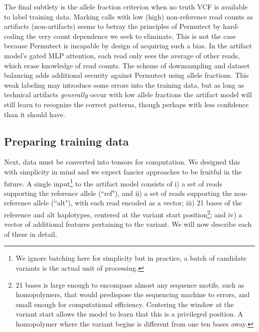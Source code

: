 \documentclass[times, twoside, watermark]{StyleBioRxiv}
\begin{document}
The final subtlety is the allele fraction criterion when no truth VCF is available to label training data.  Marking calls with low (high) non-reference read counts as artifacts (non-artifacts) seems to betray the principles of Permutect by hard-coding the very count dependence we seek to eliminate.  This is not the case because Permutect is incapable by design of acquiring such a bias.  In the artifact model's gated MLP attention, each read only sees the average of other reads, which erase knowledge of read counts. The scheme of downsampling and dataset balancing adds additional security against Permutect using allele fractions. This weak labeling may introduce some errors into the training data, but as long as technical artifacts \textit{generally} occur with low allele fractions the artifact model will still learn to recognize the correct patterns, though perhaps with less confidence than it should have.  

\subsection*{Preparing training data} 
Next, data must be converted into tensors for computation.  We designed this with simplicity in mind and we expect fancier approaches to be fruitful in the future.  A single input\footnote{We ignore batching here for simplicity but in practice, a batch of candidate variants is the actual unit of processing.} to the artifact model consists of i) a set of reads supporting the reference allele (``ref"), and ii) a set of reads supporting the non-reference allele (``alt"), with each read encoded as a vector; iii) 21 bases of the reference and alt haplotypes, centered at the variant start position\footnote{21 bases is large enough to encompass almost any sequence motifs, such as homopolymers, that would predispose the sequencing machine to errors, and small enough for computational efficiency.  Centering the window at the variant start allows the model to learn that this is a privileged position.  A homopolymer where the variant begins is different from one ten bases away.}; and iv) a vector of additional features pertaining to the variant.  We will now describe each of these in detail,
\end{document}
